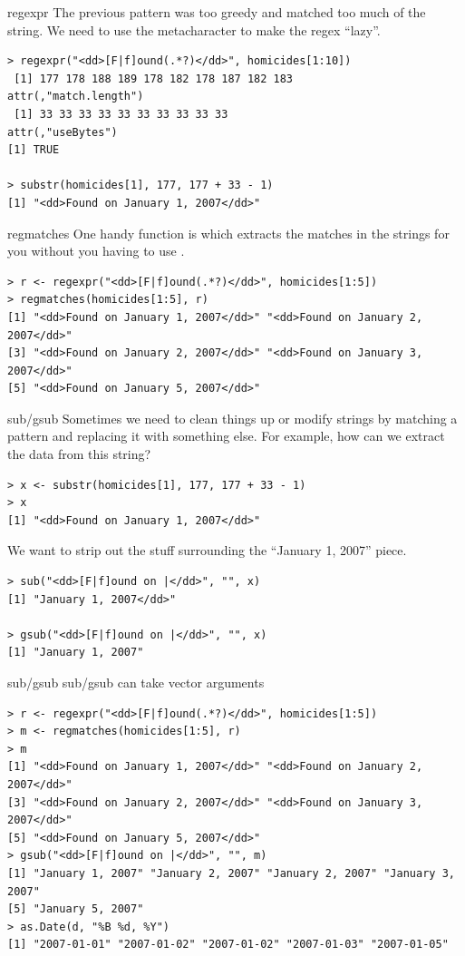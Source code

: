 \documentclass[aspectratio=169]{beamer}
\begin{document}
\begin{frame}[fragile]{regexpr}
The previous pattern was too greedy and matched too much of the
string. We need to use the  metacharacter to make the regex
``lazy''.
\begin{verbatim}
> regexpr("<dd>[F|f]ound(.*?)</dd>", homicides[1:10])
 [1] 177 178 188 189 178 182 178 187 182 183
attr(,"match.length")
 [1] 33 33 33 33 33 33 33 33 33 33
attr(,"useBytes")
[1] TRUE

> substr(homicides[1], 177, 177 + 33 - 1)
[1] "<dd>Found on January 1, 2007</dd>"

\end{verbatim}
\end{frame}

\begin{frame}[fragile]{regmatches}
One handy function is  which extracts the matches in
the strings for you without you having to use .
\begin{verbatim}
> r <- regexpr("<dd>[F|f]ound(.*?)</dd>", homicides[1:5])
> regmatches(homicides[1:5], r)
[1] "<dd>Found on January 1, 2007</dd>" "<dd>Found on January 2, 2007</dd>"
[3] "<dd>Found on January 2, 2007</dd>" "<dd>Found on January 3, 2007</dd>"
[5] "<dd>Found on January 5, 2007</dd>"
\end{verbatim}
\end{frame}

\begin{frame}[fragile]{sub/gsub}
Sometimes we need to clean things up or modify strings by matching a
pattern and replacing it with something else. For example, how can we
extract the data from this string?
\begin{verbatim}
> x <- substr(homicides[1], 177, 177 + 33 - 1)
> x
[1] "<dd>Found on January 1, 2007</dd>"
\end{verbatim}
We want to strip out the stuff surrounding the ``January 1, 2007''
piece.
\begin{verbatim}
> sub("<dd>[F|f]ound on |</dd>", "", x)
[1] "January 1, 2007</dd>"

> gsub("<dd>[F|f]ound on |</dd>", "", x)
[1] "January 1, 2007"
\end{verbatim}
\end{frame}


\begin{frame}[fragile]{sub/gsub}
sub/gsub can take vector arguments
\begin{verbatim}
> r <- regexpr("<dd>[F|f]ound(.*?)</dd>", homicides[1:5])
> m <- regmatches(homicides[1:5], r)
> m
[1] "<dd>Found on January 1, 2007</dd>" "<dd>Found on January 2, 2007</dd>"
[3] "<dd>Found on January 2, 2007</dd>" "<dd>Found on January 3, 2007</dd>"
[5] "<dd>Found on January 5, 2007</dd>"
> gsub("<dd>[F|f]ound on |</dd>", "", m)
[1] "January 1, 2007" "January 2, 2007" "January 2, 2007" "January 3, 2007"
[5] "January 5, 2007"
> as.Date(d, "%B %d, %Y")
[1] "2007-01-01" "2007-01-02" "2007-01-02" "2007-01-03" "2007-01-05"
\end{verbatim}
\end{frame}
\end{document}
